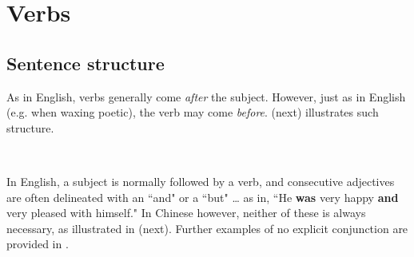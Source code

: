﻿%
\chapter{Verbs}
\section{Sentence structure}
\hfill\begin{minipage}{\tw-80mm}
As in English, verbs generally come \emph{after} the subject. 
However, just as in English (e.g. when waxing poetic),
the verb may come  \emph{before}.
 (next) illustrates such structure.
\end{minipage}\hfill
{}

\begin{example}
\mbox{}\\
\label{ex:verbsubject}
\end{example}

In English, a subject is normally followed by a verb, and 
consecutive adjectives are often delineated with an ``and" or a ``but" \ldots
as in, ``He \textbf{was} very happy \textbf{and} very pleased with himself."
In Chinese however, neither of these is always necessary, as illustrated in  (next).
Further examples of no explicit conjunction are provided in .

